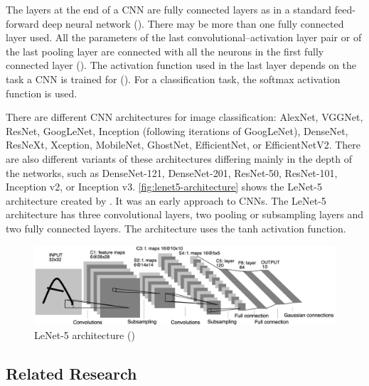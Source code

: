 \documentclass{BachelorBUI}
\begin{document}
                The layers at the end of a CNN are fully connected layers as in a standard feed-forward deep neural network (\cite{Aggarwal:2018}). There may be more than one fully connected layer used. All the parameters of the last convolutional--activation layer pair or of the last pooling layer are connected with all the neurons in the first fully connected layer (\cite{Aggarwal:2018}). The activation function used in the last layer depends on the task a CNN is trained for (\cite{Aggarwal:2018}). For a classification task, the softmax activation function is used.

                There are different CNN architectures for image classification: AlexNet, VGGNet, ResNet, GoogLeNet, Inception (following iterations of GoogLeNet), DenseNet, ResNeXt, Xception, MobileNet, GhostNet, EfficientNet, or EfficientNetV2. There are also different variants of these architectures differing mainly in the depth of the networks, such as DenseNet-121, DenseNet-201, ResNet-50, ResNet-101, Inception v2, or Inception v3. \autoref{fig:lenet5-architecture} shows the LeNet-5 architecture created by \textcite{LeCun:1998}. It was an early approach to CNNs. The LeNet-5 architecture has three convolutional layers, two pooling or subsampling layers and two fully connected layers. The architecture uses the tanh activation function.
                \begin{figure}[h]
                    \centering
                    \includegraphics[width=\textwidth]{lenet5_architecture.png}
                    \caption{\centering LeNet-5 architecture (\cite{LeCun:1998})}
                    \label{fig:lenet5-architecture}
                \end{figure}

    \subsection{Related Research}
\end{document}
